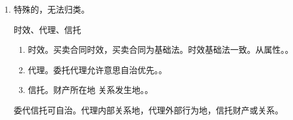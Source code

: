 \begin{enumerate}
        \begin{kk}{法人}
          \begin{enumerate}
            \item 法人登记营业地，排除机构所在地。法人内生性问题。股东权利、义务、组织机构等。。
            \item 登记设立地 = 法人的国籍，主营业地 = 经居地，主要办事机构所在地 = 住所。（多个）最密切联系。
          \end{enumerate}
        \end{kk}
  \item 特殊的，无法归类。
        \begin{kk}{时效、代理、信托}
          \begin{enumerate}
            \item 时效。买卖合同时效，买卖合同为基础法。时效基础法一致。从属性。。
            \item 代理。委托代理允许意思自治优先。。
            \item 信托。财产所在地 \hz 关系发生地。。
          \end{enumerate}
          \tcblower
          委代信托可自治。代理内部关系地，代理外部行为地，信托财产或关系。
        \end{kk}
\end{enumerate}
